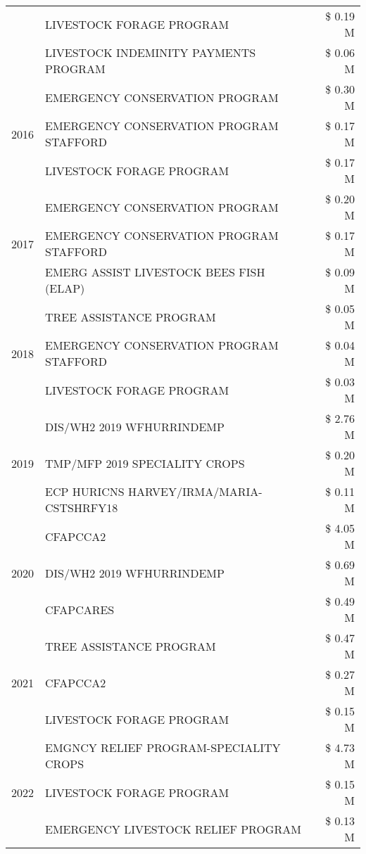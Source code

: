\begin{tabular}{llr}
 & LIVESTOCK FORAGE PROGRAM & \$ 0.19 M \\
 & LIVESTOCK INDEMINITY PAYMENTS PROGRAM & \$ 0.06 M \\
\cline{1-3}
\multirow[t]{3}{*}{2016} & EMERGENCY CONSERVATION PROGRAM & \$ 0.30 M \\
 & EMERGENCY CONSERVATION PROGRAM STAFFORD & \$ 0.17 M \\
 & LIVESTOCK FORAGE PROGRAM & \$ 0.17 M \\
\cline{1-3}
\multirow[t]{3}{*}{2017} & EMERGENCY CONSERVATION PROGRAM & \$ 0.20 M \\
 & EMERGENCY CONSERVATION PROGRAM STAFFORD & \$ 0.17 M \\
 & EMERG ASSIST LIVESTOCK BEES FISH (ELAP) & \$ 0.09 M \\
\cline{1-3}
\multirow[t]{3}{*}{2018} & TREE ASSISTANCE PROGRAM & \$ 0.05 M \\
 & EMERGENCY CONSERVATION PROGRAM STAFFORD & \$ 0.04 M \\
 & LIVESTOCK FORAGE PROGRAM & \$ 0.03 M \\
\cline{1-3}
\multirow[t]{3}{*}{2019} & DIS/WH2 2019 WFHURRINDEMP & \$ 2.76 M \\
 & TMP/MFP 2019 SPECIALITY CROPS & \$ 0.20 M \\
 & ECP HURICNS HARVEY/IRMA/MARIA-CSTSHRFY18 & \$ 0.11 M \\
\cline{1-3}
\multirow[t]{3}{*}{2020} & CFAPCCA2 & \$ 4.05 M \\
 & DIS/WH2 2019 WFHURRINDEMP & \$ 0.69 M \\
 & CFAPCARES & \$ 0.49 M \\
\cline{1-3}
\multirow[t]{3}{*}{2021} & TREE ASSISTANCE PROGRAM & \$ 0.47 M \\
 & CFAPCCA2 & \$ 0.27 M \\
 & LIVESTOCK FORAGE PROGRAM & \$ 0.15 M \\
\cline{1-3}
\multirow[t]{3}{*}{2022} & EMGNCY RELIEF PROGRAM-SPECIALITY CROPS & \$ 4.73 M \\
 & LIVESTOCK FORAGE PROGRAM & \$ 0.15 M \\
 & EMERGENCY LIVESTOCK RELIEF PROGRAM & \$ 0.13 M \\
\cline{1-3}
\bottomrule
\end{tabular}
